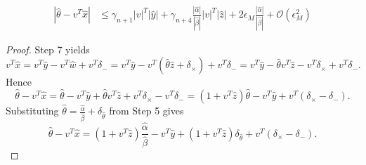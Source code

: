 \documentclass[10pt,a4paper]{amsart}
\newcommand{\eps}{\epsilon}
\begin{document}
\begin{lemma} \label{thetaZ:lem}
\begin{align*}
|\hat \theta - v^T \hat x| & \leq \gamma_{n+1} |v|^T |\hat y| +
 \gamma_{n+4} \frac{|\hat \alpha|}{|\hat \beta|} |v|^T |\hat z| + 2 \eps_M \frac{|\hat \alpha|}{|\hat \beta|}  + \mathcal{O}(\eps_M^2)
\end{align*}
\end{lemma}

\begin{proof}
Step 7 yields
\[
v^T \hat x = v^T \hat y - v^T \hat w + v^T  \delta_{-} = v^T \hat y - v^T (\hat \theta \hat z + \delta_{\times}) + v^T  \delta_{-} = v^T \hat y - \hat \theta v^T \hat z - v^T \delta_{\times} + v^T  \delta_{-}.
\]
Hence
\[
\hat \theta - v^T \hat x = \hat \theta - v^T \hat y + \hat \theta v^T \hat z + v^T \delta_{\times} - v^T  \delta_{-} = (1 + v^T \hat z) \hat \theta - v^T \hat y + v^T (\delta_{\times} -  \delta_{-}). 
\]
Substituting $\hat \theta = \frac{\hat \alpha}{\hat \beta} + \delta_{\hat \theta}$ from Step 5 gives
\begin{equation}
\label{thetaZ:eq}
\hat \theta - v^T \hat x = (1 + v^T \hat z) \frac{\hat \alpha}{\hat \beta} - v^T \hat y + (1 + v^T \hat z) \delta_{\hat \theta} + v^T (\delta_{\times} -  \delta_{-}). 
\end{equation}


\end{proof}
\end{document}
